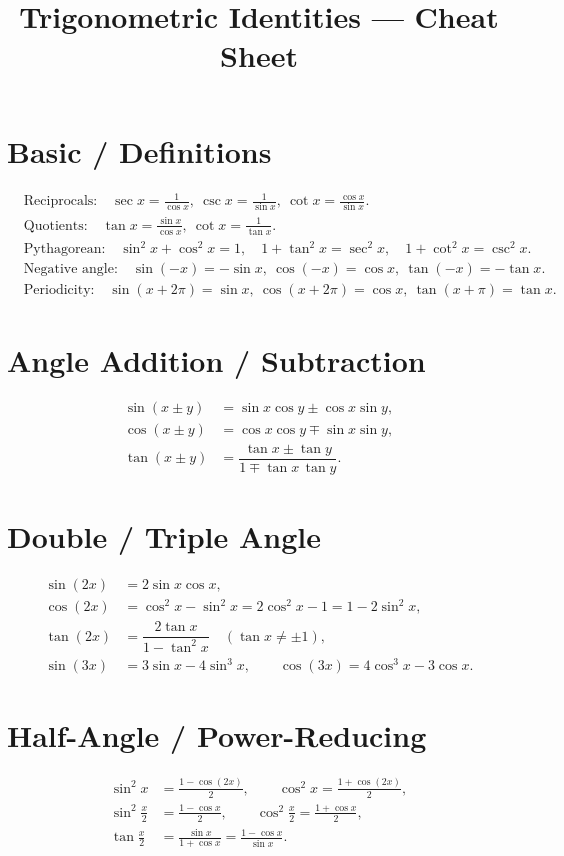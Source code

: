 \documentclass[11pt]{article}
\title{\vspace{-1em}Trigonometric Identities — Cheat Sheet}
\author{}
\date{}
\begin{document}
\maketitle
\vspace{-2em}

\section*{Basic / Definitions}
\begin{align*}
&\text{Reciprocals:}\quad \sec x=\frac1{\cos x},\ \csc x=\frac1{\sin x},\ \cot x=\frac{\cos x}{\sin x}.\\[-0.25em]
&\text{Quotients:}\quad \tan x=\frac{\sin x}{\cos x},\ \cot x=\frac{1}{\tan x}.\\[-0.25em]
&\text{Pythagorean:}\quad \sin^2x+\cos^2x=1,\quad 1+\tan^2x=\sec^2x,\quad 1+\cot^2x=\csc^2x.\\[-0.25em]
&\text{Negative angle:}\quad \sin(-x)=-\sin x,\ \cos(-x)=\cos x,\ \tan(-x)=-\tan x.\\[-0.25em]
&\text{Periodicity:}\quad \sin(x+2\pi)=\sin x,\ \cos(x+2\pi)=\cos x,\ \tan(x+\pi)=\tan x.
\end{align*}

\section*{Angle Addition / Subtraction}
\begin{align*}
\sin(x\pm y)&=\sin x\cos y\pm \cos x\sin y,\\
\cos(x\pm y)&=\cos x\cos y\mp \sin x\sin y,\\
\tan(x\pm y)&=\dfrac{\tan x\pm \tan y}{1\mp \tan x\,\tan y}.
\end{align*}

\section*{Double / Triple Angle}
\begin{align*}
\sin(2x)&=2\sin x\cos x,\\
\cos(2x)&=\cos^2x-\sin^2x=2\cos^2x-1=1-2\sin^2x,\\
\tan(2x)&=\dfrac{2\tan x}{1-\tan^2x}\quad(\tan x\neq \pm1),\\
\sin(3x)&=3\sin x-4\sin^3x,\qquad
\cos(3x)=4\cos^3x-3\cos x.
\end{align*}

\section*{Half-Angle / Power-Reducing}
\begin{align*}
\sin^2x&=\frac{1-\cos(2x)}{2},\qquad
\cos^2x=\frac{1+\cos(2x)}{2},\\
\sin^2\!\frac{x}{2}&=\frac{1-\cos x}{2},\qquad
\cos^2\!\frac{x}{2}=\frac{1+\cos x}{2},\\
\tan\frac{x}{2}&=\frac{\sin x}{1+\cos x}=\frac{1-\cos x}{\sin x}.
\end{align*}
\end{document}
